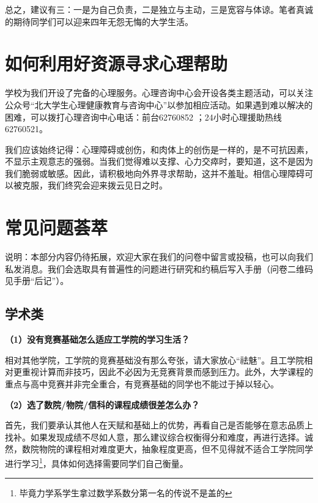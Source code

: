 \vspace{10pt}

总之，建议有三：一是为自己负责，二是独立与主动，三是宽容与体谅。笔者真诚的期待同学们可以迎来四年无怨无悔的大学生活。

\section{如何利用好资源寻求心理帮助}
学校为我们开设了完备的心理服务。心理咨询中心会开设各类主题活动，可以关注公众号“北大学生心理健康教育与咨询中心”以参加相应活动。如果遇到难以解决的困难，可以拨打心理咨询中心电话：前台62760852 ；24小时心理援助热线62760521。

\vspace{10pt}

我们应该始终记得：心理障碍或创伤，和肉体上的创伤是一样的，是不可抗因素，不显示主观意志的强弱。当我们觉得难以支撑、心力交瘁时，要知道，这不是因为我们脆弱或敏感。因此，请积极地向外界寻求帮助，这并不羞耻。相信心理障碍可以被克服，我们终究会迎来拨云见日之时。

\section{常见问题荟萃}

说明：本部分内容仍待拓展，欢迎大家在我们的问卷中留言或投稿，也可以向我们私发消息。我们会选取具有普遍性的问题进行研究和约稿后写入手册（问卷二维码见手册“后记”）。

\subsection{学术类}
\textbf{（1）没有竞赛基础怎么适应工学院的学习生活？}

相对其他学院，工学院的竞赛基础没有那么夸张，请大家放心“祛魅”。且工学院相对更重视计算而非技巧，因此不必因为无竞赛背景而感到压力。此外，大学课程的重点与高中竞赛并非完全重合，有竞赛基础的同学也不能过于掉以轻心。

\vspace{10pt}

\textbf{（2）选了数院/物院/信科的课程成绩很差怎么办？}

首先，我们要承认其他人在天赋和基础上的优势，再看自己是否能够在意志品质上找补。如果发现成绩不尽如人意，那么建议综合权衡得分和难度，再进行选择。诚然，数院物院的课程相对难度更大，抽象程度更高，但不见得就不适合工学院同学进行学习\footnote{毕竟力学系学生拿过数学系数分第一名的传说不是盖的}，具体如何选择需要同学们自己衡量。

